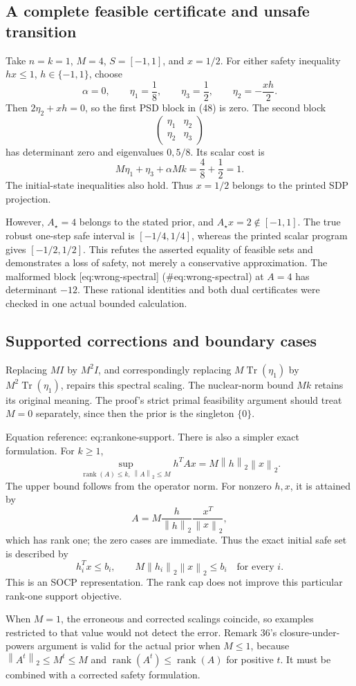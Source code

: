 \documentclass[10pt]{article}
\begin{document}
\subsection*{A complete feasible certificate and unsafe transition}
Take \(n=k=1\), \(M=4\), \(S=[-1,1]\), and \(x=1/2\). For either safety inequality \(hx\le1\), \(h\in\{-1,1\}\), choose \[\alpha=0,\qquad
 \eta_1=\frac18,\qquad \eta_3=\frac12,\qquad
 \eta_2=-\frac{xh}{2}.\] Then \(2\eta_2+xh=0\), so the first PSD block in (48) is zero. The second block \[\begin{pmatrix}\eta_1&\eta_2\\\eta_2&\eta_3\end{pmatrix}\] has determinant zero and eigenvalues \(0,5/8\). Its scalar cost is \[M\eta_1+\eta_3+\alpha Mk=\frac48+\frac12=1.\] The initial-state inequalities also hold. Thus \(x=1/2\) belongs to the printed SDP projection.\par
However, \(A_\star=4\) belongs to the stated prior, and \(A_\star x=2\notin[-1,1]\). The true robust one-step safe interval is \([-1/4,1/4]\), whereas the printed scalar program gives \([-1/2,1/2]\). This refutes the asserted equality of feasible sets and demonstrates a loss of safety, not merely a conservative approximation. The malformed block [eq:wrong-spectral] (\#eq:wrong-spectral) at \(A=4\) has determinant \(-12\). These rational identities and both dual certificates were checked in one actual bounded calculation.\par
\subsection*{Supported corrections and boundary cases}
Replacing \(MI\) by \(M^2I\), and correspondingly replacing \(M\operatorname{Tr}(\eta_1)\) by \(M^2\operatorname{Tr}(\eta_1)\), repairs this spectral scaling. The nuclear-norm bound \(Mk\) retains its original meaning. The proof’s strict primal feasibility argument should treat \(M=0\) separately, since then the prior is the singleton \(\{0\}\).\par
Equation reference: eq:rankone-support. There is also a simpler exact formulation. For \(k\ge1\), \[\sup_{\operatorname{rank}(A)\le k,\ \left\lVert A\right\rVert_2\le M}h^TAx
       =M\left\lVert h\right\rVert_2\left\lVert x\right\rVert_2.
 \] The upper bound follows from the operator norm. For nonzero \(h,x\), it is attained by \[A=M\frac{h}{\left\lVert h\right\rVert_2}\frac{x^T}{\left\lVert x\right\rVert_2},\] which has rank one; the zero cases are immediate. Thus the exact initial safe set is described by \[h_i^Tx\le b_i,\qquad M\left\lVert h_i\right\rVert_2\left\lVert x\right\rVert_2\le b_i
 \quad\text{for every }i.\] This is an SOCP representation. The rank cap does not improve this particular rank-one support objective.\par
When \(M=1\), the erroneous and corrected scalings coincide, so examples restricted to that value would not detect the error. Remark 36’s closure-under-powers argument is valid for the actual prior when \(M\le1\), because \(\left\lVert A^t\right\rVert_2\le M^t\le M\) and \(\operatorname{rank}(A^t)\le\operatorname{rank}(A)\) for positive \(t\). It must be combined with a corrected safety formulation.\par
\end{document}
